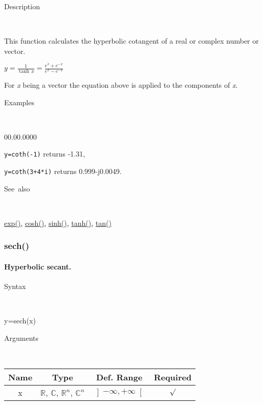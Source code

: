 \begin{description}
\item [Description]~
\end{description}
This function calculates the hyperbolic cotangent of a real or complex
number or vector.

\medskip{}
$y={\displaystyle \frac{1}{\tanh\, x}=\frac{e^{x}+e^{-x}}{e^{x}-e^{-x}}}$ 
\medskip{}

\noindent For \textit{x} being a vector the equation above is applied
to the components of \textit{x}.

\begin{description}
\item [Examples]~
\end{description}
\begin{lyxlist}{00.00.0000}
\item [\texttt{y=coth(-1)}]returns -1.31,
\item [\texttt{y=coth(3+4{*}i)}]returns 0.999-j0.0049.
\end{lyxlist}
\begin{description}
\item [See~also]~
\end{description}
\textcolor{blue}{\hyperlink{exp}{exp()}}\textcolor{black}{,} \textcolor{blue}{\hyperlink{cosh}{cosh()}}\textcolor{black}{,}
\textcolor{blue}{\hyperlink{sinh}{sinh()}}\textcolor{black}{,} \textcolor{blue}{\hyperlink{tanh}{tanh()}}\textcolor{black}{,}
\textcolor{blue}{\hyperlink{tan}{tan()}}


\newpage
\subsubsection*{\hypertarget{sech}{}{\Large sech()}}


\paragraph{\label{par:Hyperbolic-secant}Hyperbolic secant.}

\begin{description}
\item [Syntax]~
\end{description}
y=sech(x)

\begin{description}
\item [Arguments]~
\end{description}
\begin{tabular}{|c|c|c|c|}
\hline 
Name&
Type&
Def. Range&
Required\tabularnewline
\hline
\hline 
x&
$\mathbb{R}$, $\mathbb{C}$, $\mathbb{R}^{n}$, $\mathbb{C}^{n}$&
$\left]-\infty,+\infty\right[$&
$\surd$\tabularnewline
\hline
\end{tabular}

